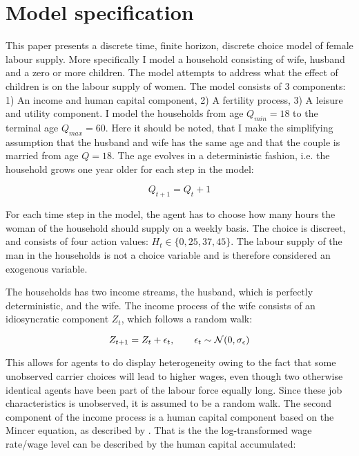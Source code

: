 \section{Model specification}\label{sec:model1}

This paper presents a discrete time, finite horizon, discrete choice model of female labour supply. More specifically I model a household consisting of wife, husband and a zero or more children. The model attempts to address what the effect of children is on the labour supply of women. The model consists of 3 components: 1) An income and human capital component, 2) A fertility process, 3) A leisure and utility component. I model the households from age $Q_{min}=18$ to the terminal age $Q_{max} = 60$. Here it should be noted, that I make the simplifying assumption that the husband and wife has the same age and that the couple is married from age $Q=18$. The age evolves in a deterministic fashion, i.e. the household grows one year older for each step in the model:

\begin{equation}
    Q_{t+1} = Q_t + 1
\end{equation}

For each time step in the model, the agent has to  choose how many hours the woman of the household should supply on a weekly basis. The choice is discreet, and consists of four action values: $H_t \in \{0, 25, 37, 45 \}$. The labour supply of the man in the households is not a choice variable and is therefore considered an exogenous variable.

The households has two income streams, the husband, which is perfectly deterministic, and the wife. The income process of the wife consists of an idiosyncratic component $Z_t$, which follows a random walk:

\begin{equation}
    Z_{t+1} = Z_t + \epsilon_t, \qquad \epsilon_t \sim \mathcal{N} (0, \sigma_\epsilon)
\end{equation}

This allows for agents to do display heterogeneity owing to the fact that some unobserved carrier choices will lead to higher wages, even though two otherwise identical agents have been part of the labour force equally long. Since these job characteristics is unobserved, it is assumed to be a random walk. The second component of the income process is a human capital component based on the Mincer equation, as described by \textcite{lemieux_mincer_2006}. That is the the log-transformed wage rate/wage level can be described by the human capital accumulated:

